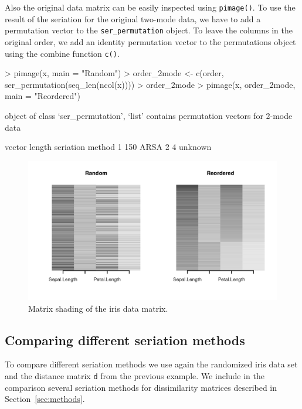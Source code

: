 \documentclass[fleqn, a4paper]{article}
\newcommand{\func}[1]{\mbox{\texttt{#1()}}}
\newcommand{\code}[1]{\mbox{\texttt{#1}}}
\begin{document}
Also the original data matrix can be easily inspected using \func{pimage}.
To use the result of the seriation for the original two-mode data,
we have to add a permutation vector to the \code{ser\_permutation}
object. To leave the columns in the original order, we add an 
identity permutation vector to the permutations object using the combine 
function \func{c}. 

\begin{Schunk}
\begin{Sinput}
> pimage(x, main = "Random")
> order_2mode <- c(order, ser_permutation(seq_len(ncol(x))))
> order_2mode
> pimage(x, order_2mode, main = "Reordered")
\end{Sinput}
\end{Schunk}
\begin{Schunk}
\begin{Soutput}
object of class ‘ser_permutation’, ‘list’
contains permutation vectors for 2-mode data

  vector length seriation method
1           150             ARSA
2             4          unknown
\end{Soutput}
\end{Schunk}
\begin{figure}
    \centering
    \includegraphics[width=12cm]{seriation-pimage2}
    \caption{Matrix shading of the iris data matrix.}
    \label{fig:pimage2}
\end{figure}

\subsection{Comparing different seriation methods}

To compare different seriation methods we use again the randomized iris data
set and the distance matrix \code{d} from the previous example.  We include in
the comparison several seriation methods for dissimilarity matrices described
in Section~\ref{sec:methods}. 
\end{document}
